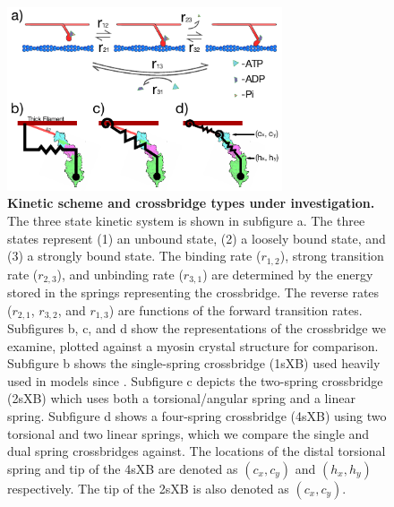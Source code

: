 \documentclass[]{article}
\begin{document}
\begin{figure}[htbp]
    \begin{center}
    \includegraphics[width=3.2in]{../imgs/Figure1.pdf}
    \caption{
        \label{fig_xb_types}
        \textbf{Kinetic scheme and crossbridge types under investigation.} 
        The three state kinetic system is shown in subfigure a. 
        The three states represent (1) an unbound state, (2) a loosely bound state, and (3) a strongly bound state. 
        The binding rate ($r_{1,2}$), strong transition rate ($r_{2,3}$), and unbinding rate ($r_{3,1}$) are determined by the energy stored in the springs representing the crossbridge. 
        The reverse rates ($r_{2,1}$, $r_{3,2}$, and $r_{1,3}$) are functions of the forward transition rates.
        Subfigures b, c, and d show the representations of the crossbridge we examine, plotted against a myosin crystal structure for comparison. 
        Subfigure b shows the single-spring crossbridge (1sXB) used heavily used in models since \protect\citep{Huxley:1957:p255}. 
        Subfigure c depicts the two-spring crossbridge (2sXB) which uses both a torsional/angular spring and a linear spring. 
        Subfigure d shows a four-spring crossbridge (4sXB) using two torsional and two linear springs, which we compare the single and dual spring crossbridges against.
        The locations of the distal torsional spring and tip of the 4sXB are denoted as $(c_x, c_y)$ and $(h_x, h_y)$ respectively. 
        The tip of the 2sXB is also denoted as $(c_x, c_y)$.
    }
    \end{center}
\end{figure}
\end{document}
